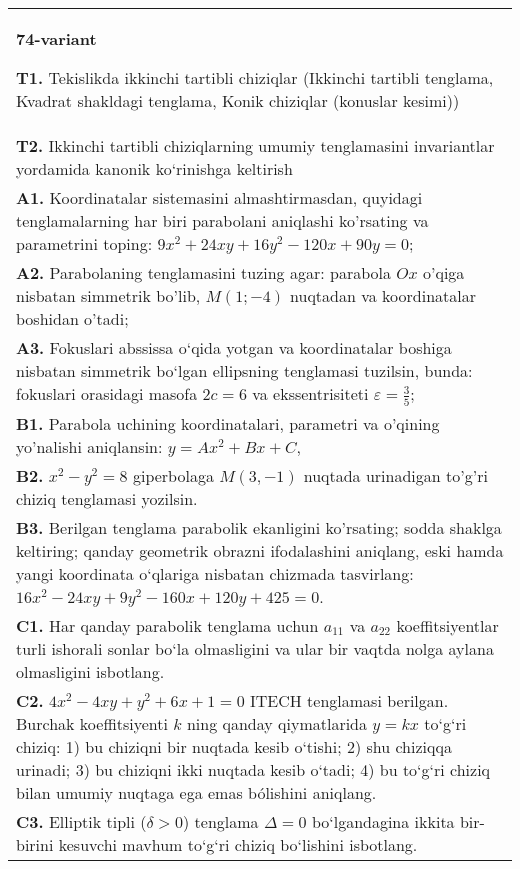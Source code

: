 \documentclass{article}
\begin{document}
\begin{tabular}{m{17cm}}
\textbf{74-variant}
\newline

\textbf{T1.} Tekislikda ikkinchi tartibli chiziqlar (Ikkinchi tartibli tenglama, Kvadrat shakldagi tenglama, Konik chiziqlar (konuslar kesimi)) \\
\textbf{T2.} Ikkinchi tartibli chiziqlarning umumiy tenglamasini invariantlar yordamida kanonik ko‘rinishga keltirish \\
\textbf{A1.} Koordinatalar sistemasini almashtirmasdan, quyidagi tenglamalarning har biri parabolani aniqlashi ko'rsating va parametrini toping: $9 x^2+24 x y+16 y^2-120 x+90 y=0$; \\
\textbf{A2.} Parabolaning tenglamasini tuzing agar: parabola $O x$ o'qiga nisbatan simmetrik bo'lib, $M(1 ;-4)$ nuqtadan va koordinatalar boshidan o'tadi; \\
\textbf{A3.} Fokuslari abssissa o‘qida yotgan va koordinatalar boshiga nisbatan simmetrik bo‘lgan ellipsning tenglamasi tuzilsin, bunda: fokuslari orasidagi masofa $2 c=6$ va ekssentrisiteti $\varepsilon=\frac{3}{5}$; \\
\textbf{B1.} Parabola uchining koordinatalari, parametri va o'qining yo'nalishi aniqlansin: $y=A x^2+B x+C$, \\
\textbf{B2.} $x^2-y^2=8$ giperbolaga $M(3,-1)$ nuqtada urinadigan to'g'ri chiziq tenglamasi yozilsin. \\
\textbf{B3.} Berilgan tenglama parabolik ekanligini ko'rsating; sodda shaklga keltiring; qanday geometrik obrazni ifodalashini aniqlang, eski hamda yangi koordinata o‘qlariga nisbatan chizmada tasvirlang: $16 x^2-24 x y+9 y^2-160 x+120 y+425=0$. \\
\textbf{C1.} Har qanday parabolik tenglama uchun $a_{11}$ va $a_{22}$ koeffitsiyentlar turli ishorali sonlar bo‘la olmasligini va ular bir vaqtda nolga aylana olmasligini isbotlang. \\
\textbf{C2.} $4 x^2-4 x y+y^2+6 x+1=0$ ITECH tenglamasi berilgan. Burchak koeffitsiyenti $k$ ning qanday qiymatlarida $y=kx$ to‘g‘ri chiziq: 1) bu chiziqni bir nuqtada kesib o‘tishi; 2) shu chiziqqa urinadi; 3) bu chiziqni ikki nuqtada kesib o‘tadi; 4) bu to‘g‘ri chiziq bilan umumiy nuqtaga ega emas bólishini aniqlang. \\
\textbf{C3.} Elliptik tipli ($\delta>0$) tenglama $\Delta=0$ bo‘lgandagina ikkita bir-birini kesuvchi mavhum to‘g‘ri chiziq bo‘lishini isbotlang. \\

\end{tabular}
\vspace{1cm}
\end{document}
